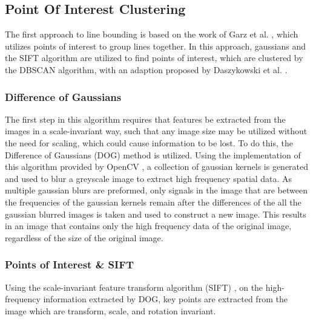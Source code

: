 \subsection{Point Of Interest Clustering}

The first approach to line bounding is based on the work of Garz et al. \cite{Garz2011, Garz2012}, which utilizes points of interest to group lines together. In this approach, gaussians and the SIFT algorithm are utilized to find points of interest, which are clustered by the DBSCAN algorithm, with an adaption proposed by Daszykowski et al. \cite{Daszykowski}.

\subsubsection{Difference of Gaussians}

The first step in this algorithm requires that features be extracted from the images in a scale-invariant way, such that any image size may be utilized without the need for scaling, which could cause information to be lost. To do this, the Difference of Gaussians (DOG) method is utilized. Using the implementation of this algorithm provided by OpenCV \cite{OpenCV}, a collection of gaussian kernels is generated and used to blur a greyscale image to extract high frequency spatial data. As multiple gaussian blurs are preformed, only signals in the image that are between the frequencies of the gaussian kernels remain after the differences of the all the gaussian blurred images is taken and used to construct a new image. This results in an image that contains only the high frequency data of the original image, regardless of the size of the original image.

\subsubsection{Points of Interest \& SIFT}

Using the scale-invariant feature transform algorithm (SIFT) \cite{Lowe}, on the high-frequency information extracted by DOG, key points are extracted from the image which are transform, scale, and rotation invariant.


